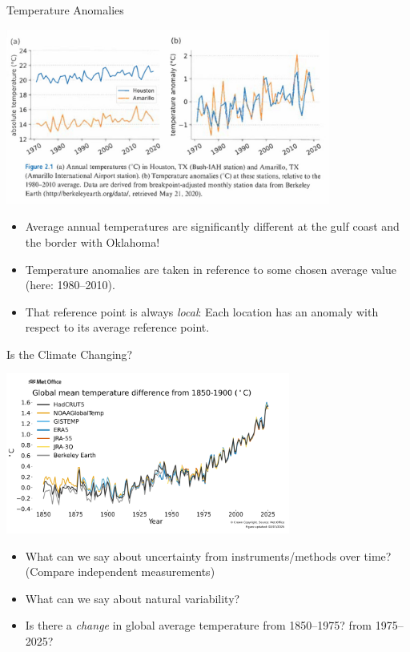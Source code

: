 \documentclass[12pt]{beamer}
\begin{document}
\begin{frame}{Temperature Anomalies}



\begin{center}
\includegraphics[width=0.8\textwidth]{images/dessler_amarillo-vs-houston_fig2-1.jpg}
\end{center}

\begin{itemize}
\item Average annual temperatures are significantly different at the gulf coast and the border with Oklahoma!
\item Temperature anomalies are taken in reference to some chosen average value (here: 1980--2010).
\item That reference point is always {\em local}: Each location has an anomaly with respect to its average reference point.
\end{itemize}

\end{frame}
\begin{frame}{Is the Climate Changing?}



\begin{center}
\includegraphics[width=0.7\textwidth]{images/global-average-temperature_met-office_2025-09}
\end{center}
%
\begin{itemize}
\item What can we say about uncertainty from instruments/methods over time? (Compare independent measurements)
\item What can we say about natural variability?
\item Is there a {\em change} in global average temperature from 1850--1975?  from 1975--2025?
\end{itemize}
%

\end{frame}
\end{document}
